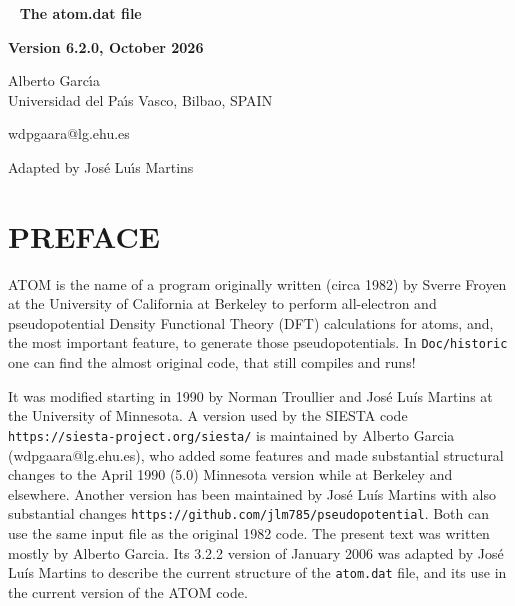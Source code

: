 \documentclass[11pt]{article}
\begin{document}

\begin{titlepage}

\begin{center}
~
\vfill
\vspace{1cm}
{\Huge {\bf The atom.dat file}}
\par\vspace{3cm}
\hrulefill
\par\vspace{3cm}
{\Large {\bf Version 6.2.0, October 2026}}
\par\vspace{2cm}
\hrulefill

{\Large Alberto Garc\'{\i}a \\
 Universidad del Pa\'{\i}s Vasco, Bilbao, SPAIN

  wdpgaara@lg.ehu.es

Adapted by Jos\'e Lu\'{\i}s Martins
  }
\vfill
\end{center}

\end{titlepage}

\tableofcontents
\newpage

\section{PREFACE}

{\sc ATOM} is the name of a program originally written (circa 1982) by
Sverre Froyen at the University of California at Berkeley to
perform all-electron and pseudopotential Density Functional Theory (DFT) calculations for atoms,
and, the most important feature, to generate those pseudopotentials.
In \texttt{Doc/historic} one can find the almost original code, that still compiles and runs!

It was modified
starting in 1990 by Norman Troullier and José Luís Martins at the
University of Minnesota.   A version used by the \textsc{SIESTA} code
\texttt{https://siesta-project.org/siesta/}
is maintained by Alberto Garcia (wdpgaara@lg.ehu.es), who added some features and made substantial
structural changes to the April 1990 (5.0) Minnesota version while at
Berkeley and elsewhere.  Another version has been maintained by
José Luís Martins with also substantial changes
\texttt{https://github.com/jlm785/pseudopotential}.
Both can use the same input file as the original 1982 code.
The present text was written mostly by Alberto Garcia.  Its 3.2.2 version of January 2006
was adapted by
José Luís Martins to describe the current structure of the \texttt{atom.dat} file, and its use in
the current version of the \textsc{ATOM} code.
\end{document}

